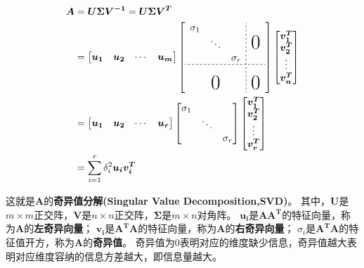 \documentclass{article}
\begin{document}
\begin{CJK}{UTF8}{gbsn}
	\begin{align*}
	\boldsymbol{A}&=\boldsymbol{U\Sigma V^{-1}}=\boldsymbol{U\Sigma V^T}\\
	&=\begin{bmatrix}\boldsymbol{u_1}&\boldsymbol{u_2}&\cdots&\boldsymbol{u_m}\end{bmatrix}
	\left [\begin{array}{ccc;{2pt/2pt}ccc}
    \sigma_1& & &\\
     &\ddots& &\text{\huge0}\\
     & &\sigma_r&\\
    \hdashline[2pt/2pt]
     & & & \\
     &\text{\huge0}& &\text{\huge0}
    \end{array}\right ]
	\begin{bmatrix}\boldsymbol{v^T_1}\\\boldsymbol{v^T_2}\\\vdots\\\boldsymbol{v^T_n}\end{bmatrix}\\
	&=\begin{bmatrix}\boldsymbol{u_1}&\boldsymbol{u_2}&\cdots&\boldsymbol{u_r}\end{bmatrix}
	\begin{bmatrix}\sigma_1& & \\ &\ddots& \\ & &\sigma_r\end{bmatrix}
	\begin{bmatrix}\boldsymbol{v^T_1}\\\boldsymbol{v^T_2}\\\vdots\\\boldsymbol{v^T_r}\end{bmatrix}\\
	&=\sum_{i=1}^r\delta^2_i\boldsymbol{u_iv^T_i}
	\end{align*}

	这就是$\boldsymbol{A}$的\textbf{奇异值分解(Singular Value Decomposition,SVD)}。
	其中，$\boldsymbol{U}$是$m\times m$正交阵，$\boldsymbol{V}$是$n\times n$正交阵，$\boldsymbol{\Sigma}$是$m\times n$对角阵。
	$\boldsymbol{u_i}$是$\boldsymbol{AA^T}$的特征向量，称为$\boldsymbol{A}$的\textbf{左奇异向量}；
	$\boldsymbol{v_i}$是$\boldsymbol{A^TA}$的特征向量，称为$\boldsymbol{A}$的\textbf{右奇异向量}；
	$\sigma_i$是$\boldsymbol{A^TA}$的特征值开方，称为$\boldsymbol{A}$的\textbf{奇异值}。
	奇异值为0表明对应的维度缺少信息，奇异值越大表明对应维度容纳的信息方差越大，即信息量越大。\par
	

\end{CJK}
\end{document}
